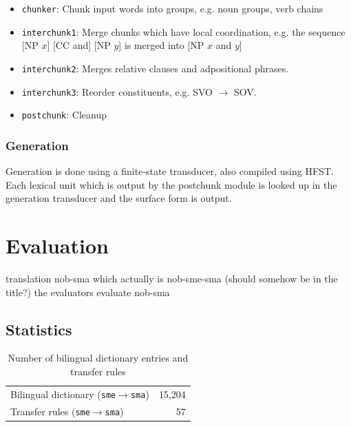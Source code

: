 \documentclass[a4paper,11pt,twocolumn]{article}
\begin{document}

\begin{itemize} 
  \item \texttt{chunker}: Chunk input words into groups, e.g. noun groups, verb chains
  \item \texttt{interchunk1}: Merge chunks which have local coordination, e.g. the sequence [NP $x$] [CC and] [NP $y$] is merged into [NP $x$ and $y$]
  \item \texttt{interchunk2}: Merges relative clauses and adpositional phrases.
  \item \texttt{interchunk3}: Reorder constituents, e.g. SVO $\rightarrow$ SOV.
  \item \texttt{postchunk}: Cleanup
\end{itemize}

\subsubsection{Generation}

Generation is done using a finite-state transducer, also 
compiled using HFST. Each lexical unit which is output by
the postchunk module is looked up in the generation transducer
and the surface form is output.

\section{Evaluation}
 translation nob-sma which actually is nob-sme-sma (should somehow be in the title?) 
 the evaluators evaluate nob-sma

\subsection{Statistics}
\begin{table}
  \begin{center}
    \begin{tabular}{|l|r|}
      \hline
      Bilingual dictionary ({\tt sme}$\rightarrow${\tt sma}) & 15,204 \\ %
      Transfer rules ({\tt sme}$\rightarrow${\tt sma}) & 57 \\
      \hline
    \end{tabular}
    \label{table:transfer}
    \caption{Number of bilingual dictionary entries and transfer rules}
  \end{center}
\end{table}
\end{document}
